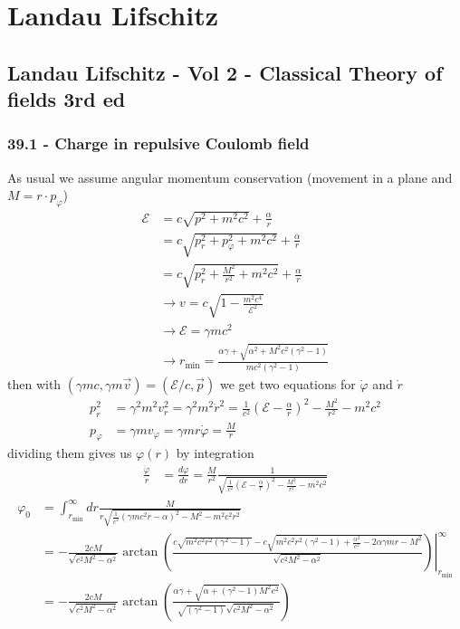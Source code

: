 \documentclass[10pt,a4paper]{book}
\theoremstyle{definition}
\begin{document}
\chapter{Landau Lifschitz}
\section{{\sc Landau Lifschitz} - Vol 2 - Classical Theory of fields 3rd ed}
\subsection{39.1 - Charge in repulsive Coulomb field}
As usual we assume angular momentum conservation (movement in a plane and $M=r\cdot p_\varphi$) 
\begin{align}
\mathcal{E}
&=c\sqrt{p^2+m^2c^2}+\frac{\alpha}{r}\\
&=c\sqrt{p_r^2+p_\varphi^2+m^2c^2}+\frac{\alpha}{r}\\
&=c\sqrt{p_r^2+\frac{M^2}{r^2}+m^2c^2}+\frac{\alpha}{r}\\
&\rightarrow v=c\sqrt{1-\frac{m^2c^4}{\mathcal{E}^2}}\\
&\rightarrow \mathcal{E}=\gamma mc^2\\
&\rightarrow r_\text{min}=\frac{\alpha\gamma+\sqrt{\alpha^2+M^2c^2(\gamma^2-1)}}{mc^2(\gamma^2-1)}
\end{align}
then with $(\gamma mc,\gamma m\vec{v})=(\mathcal{E}/c,\vec{p})$ we get two equations for $\dot\varphi$ and $\dot r$
\begin{align}
p_r^2&=\gamma^2m^2v_r^2=\gamma^2m^2\dot{r}^2=\frac{1}{c^2}\left(\mathcal{E}-\frac{\alpha}{r}\right)^2-\frac{M^2}{r^2}-m^2c^2\\
p_\varphi&=\gamma m v_\varphi=\gamma m r\dot{\varphi}=\frac{M}{r}
\end{align}
dividing them gives us $\varphi(r)$ by integration
\begin{align}
\frac{\dot\varphi}{\dot{r}}
&=\frac{d\varphi}{dr}
=\frac{M}{r^2}\frac{1}{\sqrt{\frac{1}{c^2}\left(\mathcal{E}-\frac{\alpha}{r}\right)^2-\frac{M^2}{r^2}-m^2c^2}}
\end{align}
\begin{align}
\varphi_0
&=\int^\infty_{r_\text{min}} dr\frac{M}{r\sqrt{\frac{1}{c^2}\left(\gamma m c^2r-\alpha\right)^2-M^2-m^2c^2r^2}}\\
&=\left.-\frac{2 c M}{\sqrt{c^2 M^2-\alpha ^2}} \arctan\left(\frac{c\sqrt{m^2c^2r^2 \left(\gamma ^2-1\right)}-c
   \sqrt{m^2c^2r^2 \left(\gamma ^2-1\right) +\frac{\alpha ^2}{c^2}-2 \alpha  \gamma  mr-M^2}}{\sqrt{c^2 M^2-\alpha ^2}}\right)\right|_{r_\text{min}}^\infty\\
&=-\frac{2 c M}{\sqrt{c^2 M^2-\alpha ^2}} \arctan\left(\frac{\alpha  \gamma + \sqrt{\alpha
+\left(\gamma ^2-1\right) M^2c^2}}{\sqrt{ \left(\gamma ^2-1\right)} \sqrt{c^2 M^2-\alpha ^2}}\right)
\end{align}
\end{document}
